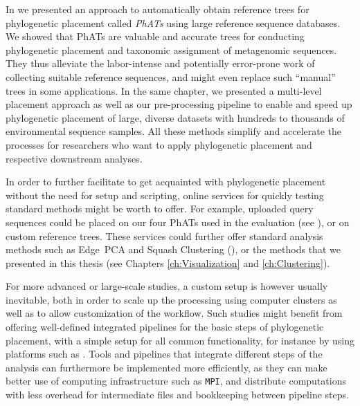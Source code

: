 In  we presented an approach to automatically obtain
reference trees for phylogenetic placement called \emph{\acfp{PhAT}} using large reference sequence databases.
We showed that \acp{PhAT} are valuable and accurate trees for
conducting phylogenetic placement and taxonomic assignment of metagenomic sequences.
They thus alleviate the labor-intense and potentially error-prone work of collecting suitable reference sequences,
and might even replace such ``manual'' trees in some applications.
In the same chapter, we presented a multi-level placement approach as well as our pre-processing pipeline
to enable and speed up phylogenetic placement
of large, diverse datasets with hundreds to thousands of environmental sequence samples.
All these methods simplify and accelerate the processes for researchers
who want to apply phylogenetic placement and respective downstream analyses.

In order to further facilitate to get acquainted with phylogenetic placement without the need for setup and scripting,
online services for quickly testing standard methods might be worth to offer.
For example, uploaded query sequences could be placed on our four \acp{PhAT} used in the evaluation
(see ),
or on custom reference trees.
These services could further offer standard analysis methods such as Edge~PCA and Squash Clustering
(),
or the methods that we presented in this thesis (see Chapters \ref{ch:Visualization} and \ref{ch:Clustering}).

For more advanced or large-scale studies, a custom setup is however usually inevitable,
both in order to scale up the processing using computer clusters as well as to allow customization of the workflow.
Such studies might benefit from offering well-defined integrated pipelines for the basic steps of phylogenetic placement,
with a simple setup for all common functionality,
for instance by using platforms such as  \cite{Afgan2018}.
Tools and pipelines that integrate different steps of the analysis can furthermore be implemented more efficiently,
as they can make better use of computing infrastructure such as \texttt{\acs{MPI}},
and distribute computations with less overhead for intermediate files and bookkeeping between pipeline steps.

